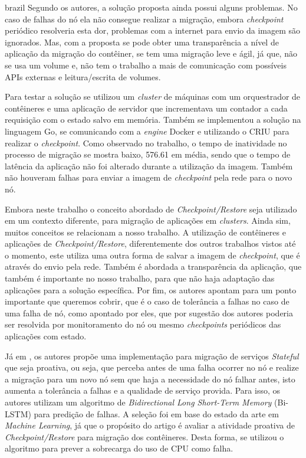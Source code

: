 \begin{otherlanguage*}{brazil}
Segundo os autores, a solução proposta ainda possui alguns problemas. No
caso de falhas do nó ela não consegue realizar a migração, embora
\textit{checkpoint} periódico resolveria esta dor, problemas com a internet
para envio da imagem são ignorados. Mas, com a proposta se pode obter uma
transparência a nível de aplicação da migração do contêiner, se tem uma
migração leve e ágil, já que, não se usa um volume e, não tem o trabalho
a mais de comunicação com possíveis APIs externas e leitura/escrita de volumes.

Para testar a solução se utilizou um \textit{cluster} de máquinas com um
orquestrador de contêineres e uma aplicação de servidor que incrementava
um contador a cada requisição com o estado salvo em memória. Também se
implementou a solução na linguagem Go, se comunicando com a \textit{engine}
Docker e utilizando o CRIU para realizar o \textit{checkpoint}. Como
observado no trabalho, o tempo de inatividade no processo de migração se
mostra baixo, 576.61 em média, sendo que o tempo de latência da aplicação
não foi alterado durante a utilização da imagem. Também não houveram
falhas para enviar a imagem de \textit{checkpoint} pela rede para o novo nó.

Embora neste trabalho o conceito abordado de \textit{Checkpoint/Restore}
seja utilizado em um contexto diferente, para migração de aplicações em
\textit{clusters}. Ainda sim, muitos conceitos se relacionam a nosso trabalho.
A utilização de contêineres e aplicações de \textit{Checkpoint/Restore},
diferentemente dos outros trabalhos vistos até o momento, este utiliza uma
outra forma de salvar a imagem de \textit{checkpoint}, que é através do envio
pela rede. Também é abordada a transparência da aplicação, que também é
importante no nosso trabalho, para que não haja adaptação das aplicações
para a solução específica. Por fim, os autores apontam para um ponto
importante que queremos cobrir, que é o caso de tolerância a falhas no caso
de uma falha de nó, como apontado por eles, que por sugestão dos autores
poderia ser resolvida por monitoramento do nó ou mesmo \textit{checkpoints}
periódicos das aplicações com estado.

Já em \cite{tran2022proactive}, os autores propõe uma implementação
para migração de serviços \textit{Stateful} que seja proativa, ou seja,
que perceba antes de uma falha ocorrer no nó e realize a migração para
um novo nó sem que haja a necessidade do nó falhar antes, isto aumenta
a tolerância a falhas e a qualidade de serviço provida. Para isso, os
autores utilizam um algoritmo de \textit{Bidirectional Long Short-Term
Memory} (Bi-LSTM) para predição de falhas. A seleção foi em base do estado
da arte em \textit{Machine Learning}, já que o propósito do artigo é
avaliar a atividade proativa de \textit{Checkpoint/Restore} para
migração dos contêineres. Desta forma, se utilizou o algoritmo para prever
a sobrecarga do uso de CPU como falha.


\end{otherlanguage*}
